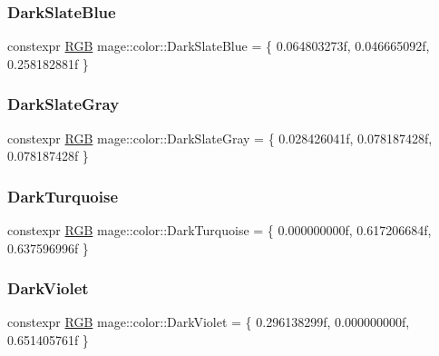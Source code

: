 \subsubsection{\texorpdfstring{Dark\+Slate\+Blue}{DarkSlateBlue}}
{\footnotesize\ttfamily constexpr \hyperlink{structmage_1_1_r_g_b}{R\+GB} mage\+::color\+::\+Dark\+Slate\+Blue = \{ 0.\+064803273f, 0.\+046665092f, 0.\+258182881f \}}

\hypertarget{namespacemage_1_1color_ac2267d00e970246ed57ab091410f3d0b}{}\label{namespacemage_1_1color_ac2267d00e970246ed57ab091410f3d0b} 
\subsubsection{\texorpdfstring{Dark\+Slate\+Gray}{DarkSlateGray}}
{\footnotesize\ttfamily constexpr \hyperlink{structmage_1_1_r_g_b}{R\+GB} mage\+::color\+::\+Dark\+Slate\+Gray = \{ 0.\+028426041f, 0.\+078187428f, 0.\+078187428f \}}

\hypertarget{namespacemage_1_1color_a4717affd7c87b2f89b9e461b16510f56}{}\label{namespacemage_1_1color_a4717affd7c87b2f89b9e461b16510f56} 
\subsubsection{\texorpdfstring{Dark\+Turquoise}{DarkTurquoise}}
{\footnotesize\ttfamily constexpr \hyperlink{structmage_1_1_r_g_b}{R\+GB} mage\+::color\+::\+Dark\+Turquoise = \{ 0.\+000000000f, 0.\+617206684f, 0.\+637596996f \}}

\hypertarget{namespacemage_1_1color_adb191fa4601ac336db967a8ec301370f}{}\label{namespacemage_1_1color_adb191fa4601ac336db967a8ec301370f} 
\subsubsection{\texorpdfstring{Dark\+Violet}{DarkViolet}}
{\footnotesize\ttfamily constexpr \hyperlink{structmage_1_1_r_g_b}{R\+GB} mage\+::color\+::\+Dark\+Violet = \{ 0.\+296138299f, 0.\+000000000f, 0.\+651405761f \}}

\hypertarget{namespacemage_1_1color_aa68a1c007257021aa438e5ad8251e0b1}{}\label{namespacemage_1_1color_aa68a1c007257021aa438e5ad8251e0b1} 
